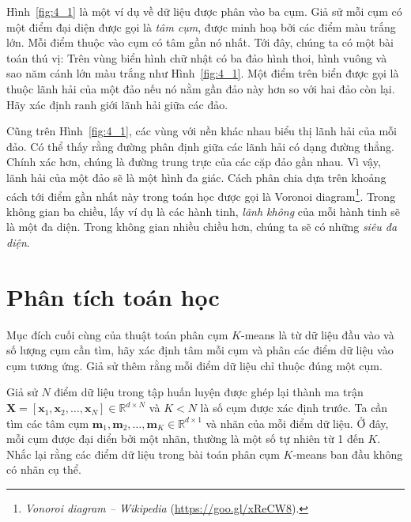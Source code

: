 Hình~\ref{fig:4_1} là một ví dụ về dữ liệu được phân vào ba cụm. Giả sử mỗi cụm
có một điểm đại diện được gọi là \textit{tâm cụm}, được minh hoạ bởi các điểm
màu trắng lớn. Mỗi điểm thuộc vào cụm có tâm gần nó nhất. Tới đây, chúng ta có
một bài toán thú vị: {Trên vùng biển hình chữ nhật có ba đảo hình thoi, hình
vuông và sao năm cánh lớn màu trắng như Hình~\ref{fig:4_1}. Một điểm trên biển
được gọi là thuộc lãnh hải của một đảo nếu nó nằm gần đảo này hơn so với hai đảo
còn lại. Hãy xác định ranh giới lãnh hải giữa các đảo.}

Cũng trên Hình~\ref{fig:4_1}, các vùng với nền khác nhau biểu thị lãnh hải của
mỗi đảo. Có thể thấy rằng đường phân định giữa các lãnh hải có dạng đường
thẳng. Chính xác hơn, chúng là đường trung trực của các cặp đảo gần nhau. Vì
vậy, lãnh hải của một đảo sẽ là một hình đa giác. Cách phân chia dựa trên khoảng
cách tới điểm gần nhất này trong toán học được gọi là Voronoi
diagram\footnote{\textit{Vonoroi diagram -- Wikipedia}
(\url{https://goo.gl/xReCW8}).}. Trong không gian ba chiều, lấy ví dụ là các
hành tinh, \textit{lãnh không} của mỗi hành tinh sẽ là một đa diện. Trong không
gian nhiều chiều hơn, chúng ta sẽ có những \textit{siêu đa diện}.




\section{Phân tích toán học }

Mục đích cuối cùng của thuật toán phân cụm $K$-means là từ dữ liệu đầu vào và số
lượng cụm cần tìm, hãy xác định tâm mỗi cụm và phân các điểm dữ liệu vào cụm
tương ứng. Giả sử thêm rằng mỗi điểm dữ liệu chỉ thuộc đúng một cụm.


Giả sử $N$ điểm dữ liệu trong tập huấn luyện được ghép lại thành ma trận $ \mathbf{X} =
[\mathbf{x}_1, \mathbf{x}_2, \dots,
\mathbf{x}_N] \in \mathbb{R}^{d \times N}$ và $K < N$ là số cụm được xác định trước. Ta cần tìm các tâm cụm $ \mathbf{m}_1, \mathbf{m}_2,
\dots, \mathbf{m}_K \in \mathbb{R}^{d \times 1}$ và nhãn của mỗi điểm dữ liệu.
Ở đây, mỗi cụm được đại diển bởi một nhãn, thường là một số tự nhiên từ 1
đến $K$. Nhắc lại rằng các điểm dữ liệu trong bài toán phân cụm $K$-means ban
đầu không có nhãn cụ thể.

